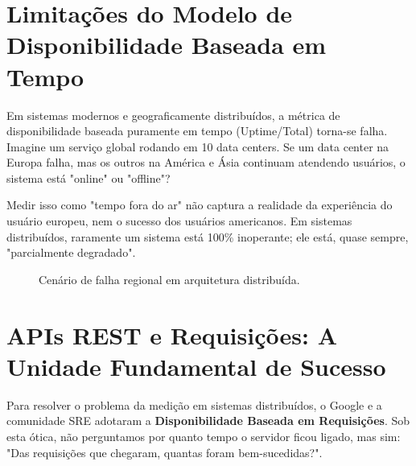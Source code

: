 \documentclass[12pt,a4paper]{report}
\begin{document}
\section{Limitações do Modelo de Disponibilidade Baseada em Tempo}

Em sistemas modernos e geograficamente distribuídos, a métrica de disponibilidade baseada puramente em tempo (Uptime/Total) torna-se falha. Imagine um serviço global rodando em 10 data centers. Se um data center na Europa falha, mas os outros na América e Ásia continuam atendendo usuários, o sistema está "online" ou "offline"?

Medir isso como "tempo fora do ar" não captura a realidade da experiência do usuário europeu, nem o sucesso dos usuários americanos. Em sistemas distribuídos, raramente um sistema está 100\% inoperante; ele está, quase sempre, "parcialmente degradado".

\begin{figure}[h]
    \centering
    \caption{Cenário de falha regional em arquitetura distribuída.}
\end{figure}

\section{APIs REST e Requisições: A Unidade Fundamental de Sucesso}

Para resolver o problema da medição em sistemas distribuídos, o Google e a comunidade SRE adotaram a \textbf{Disponibilidade Baseada em Requisições}. Sob esta ótica, não perguntamos por quanto tempo o servidor ficou ligado, mas sim: "Das requisições que chegaram, quantas foram bem-sucedidas?".
\end{document}
